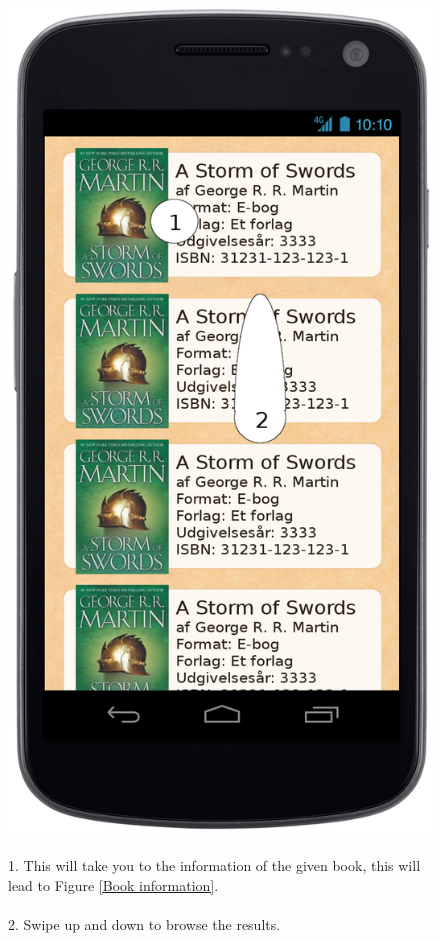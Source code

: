 \documentclass[12pt]{article}
\begin{document}
\begin{figure}
\includegraphics[scale=0.7]{gnexresultater.png}
\caption{
\\
1. This will take you to the information of the given book, this will lead to Figure \ref{Book information}.\\\\
2. Swipe up and down to browse the results.
}
\label{Results}
\end{figure}
\end{document}
